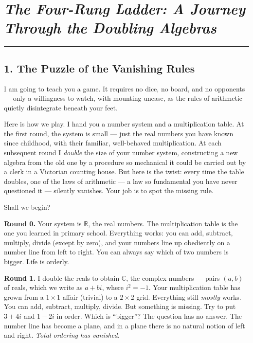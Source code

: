 \chapter{\texorpdfstring{\emph{The Four-Rung Ladder: A Journey Through the Doubling Algebras}}{The Four-Rung Ladder: A Journey Through the Doubling Algebras}}
\bigskip\noindent\rule{\linewidth}{0.4pt}\bigskip

\section{1. The Puzzle of the Vanishing Rules}
I am going to teach you a game. It requires no dice, no board, and no opponents --- only a willingness to watch, with mounting unease, as the rules of arithmetic quietly disintegrate beneath your feet.

Here is how we play. I hand you a number system and a multiplication table. At the first round, the system is small --- just the real numbers you have known since childhood, with their familiar, well-behaved multiplication. At each subsequent round I \emph{double} the size of your number system, constructing a new algebra from the old one by a procedure so mechanical it could be carried out by a clerk in a Victorian counting house. But here is the twist: every time the table doubles, one of the laws of arithmetic --- a law so fundamental you have never questioned it --- silently vanishes. Your job is to spot the missing rule.

Shall we begin?

\textbf{Round 0.} Your system is \(\mathbb{R}\), the real numbers. The multiplication table is the one you learned in primary school. Everything works: you can add, subtract, multiply, divide (except by zero), and your numbers line up obediently on a number line from left to right. You can always say which of two numbers is bigger. Life is orderly.

\textbf{Round 1.} I double the reals to obtain \(\mathbb{C}\), the complex numbers --- pairs \((a, b)\) of reals, which we write as \(a + bi\), where \(i^2 = -1\). Your multiplication table has grown from a \(1 \times 1\) affair (trivial) to a \(2 \times 2\) grid. Everything still \emph{mostly} works. You can add, subtract, multiply, divide. But something is missing. Try to put \(3 + 4i\) and \(1 - 2i\) in order. Which is ``bigger''? The question has no answer. The number line has become a plane, and in a plane there is no natural notion of left and right. \emph{Total ordering has vanished.}

